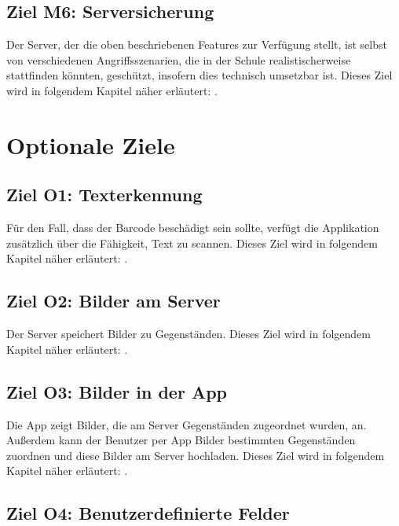 \documentclass[
    headings=optiontotocandhead,%
    twoside,
    numbers=noenddot,%
    toc=flat, %
    12pt, %
    titlepage, %
    parskip=full, %
    listof=totoc, %
    listof=flat, %
    numbers=noenddot, %
    bibliography=totoc, %
    a4paper,DIV=14,
    BCOR=15mm,
]{scrbook}
\begin{document}
        \subsection*{Ziel M6: Serversicherung}

        Der Server, der die oben beschriebenen Features zur Verfügung stellt, ist selbst von verschiedenen Angriffsszenarien, die in der Schule realistischerweise stattfinden könnten, geschützt, insofern dies technisch umsetzbar ist. 
        Dieses Ziel wird in folgendem Kapitel näher erläutert: .


\section{Optionale Ziele}


 \subsection*{Ziel O1: Texterkennung}
  Für den Fall, dass der Barcode beschädigt sein sollte, verfügt die Applikation zusätzlich über die Fähigkeit, Text zu scannen.  
  Dieses Ziel wird in folgendem Kapitel näher erläutert: .




  \subsection*{Ziel O2: Bilder am Server}
  Der Server speichert Bilder zu Gegenständen.  
  Dieses Ziel wird in folgendem Kapitel näher erläutert: .



  \subsection*{Ziel O3: Bilder in der App}

  Die App zeigt Bilder, die am Server Gegenständen zugeordnet wurden, an. Außerdem kann der Benutzer per App Bilder bestimmten Gegenständen zuordnen und diese Bilder am Server hochladen.
  Dieses Ziel wird in folgendem Kapitel näher erläutert: .




  \subsection*{Ziel O4: Benutzerdefinierte Felder}
\end{document}
